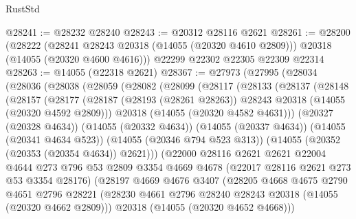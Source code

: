 \begin{lexlean}{RustStd}
\begin{coremodule}
@28241 := @28232 @28240
@28243 := @20312 @28116 @2621
@28261 := @28200
    (@28222
      (@28241 @28243 @20318 (@14055 (@20320 @4610 @2809)))
      @20318
      (@14055 (@20320 @4600 @4616)))
    @22299
    @22302
    @22305
    @22309
    @22314
@28263 := @14055 (@22318 @2621)
@28367 := @27973
    (@27995
      (@28034
        (@28036
          (@28038
            (@28059
              (@28082
                (@28099
                  (@28117
                    (@28133
                      (@28137
                        (@28148
                          (@28157
                            (@28177
                              (@28187
                                (@28193 (@28261 @28263))
                                @28243
                                @20318
                                (@14055 (@20320 @4592 @2809)))
                              @20318
                              (@14055 (@20320 @4582 @4631)))
                            (@20327 (@20328 @4634))
                            (@14055 (@20332 @4634))
                            (@14055 (@20337 @4634))
                            (@14055 (@20341 @4634 @523))
                            (@14055 (@20346 @794 @523 @313))
                            (@14055 (@20352 (@20353 (@20354 @4634)) @2621)))
                          (@22000
                            @28116
                            @2621
                            @2621
                            @22004
                            @4644
                            @273
                            @796
                            @53
                            @2809
                            @3354
                            @4669
                            @4678
                            (@22017 @28116 @2621 @273 @53 @3354 @28176)
                            (@28197
                              @4669
                              @4676
                              @3407
                              (@28205
                                @4668
                                @4675
                                @2790
                                @4651
                                @2796
                                @28221
                                (@28230
                                  @4661
                                  @2796
                                  @28240
                                  @28243
                                  @20318
                                  (@14055 (@20320 @4662 @2809)))
                                @20318
                                (@14055 (@20320 @4652 @4668)))

\end{coremodule}
\end{lexlean}

